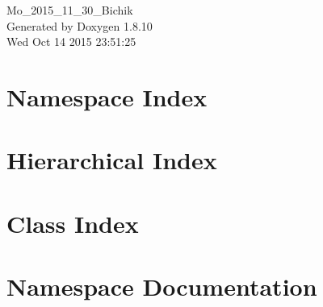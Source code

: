 \documentclass[twoside]{book}
\newcommand{\+}{\discretionary{\mbox{\scriptsize$\hookleftarrow$}}{}{}}
\newcommand{\clearemptydoublepage}{%
  \newpage{\pagestyle{empty}\cleardoublepage}%
}
\begin{document}
\hypersetup{pageanchor=false,
             bookmarks=true,
             bookmarksnumbered=true,
             pdfencoding=unicode
            }
\begin{titlepage}
\vspace*{7cm}
\begin{center}%
{\Large Mo\+\_\+2015\+\_\+11\+\_\+30\+\_\+\+Bichik }\\
\vspace*{1cm}
{\large Generated by Doxygen 1.8.10}\\
\vspace*{0.5cm}
{\small Wed Oct 14 2015 23:51:25}\\
\end{center}
\end{titlepage}
\clearemptydoublepage
\tableofcontents
\clearemptydoublepage
{}
\hypersetup{pageanchor=true}

\chapter{Namespace Index}

\chapter{Hierarchical Index}

\chapter{Class Index}

\chapter{Namespace Documentation}



\end{document}
